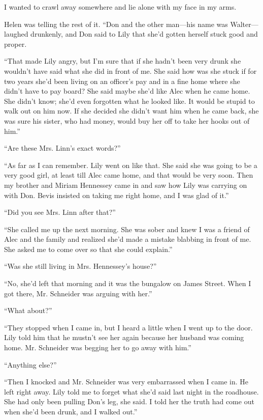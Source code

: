\documentclass{novel}
\begin{document}
I wanted to crawl away somewhere and lie alone with my face in my arms.

Helen was telling the rest of it. “Don and the other man—his name was Walter—laughed drunkenly, and Don said to Lily that she’d gotten herself stuck good and proper. 

“That made Lily angry, but I’m sure that if she hadn’t been very drunk she wouldn’t have said what she did in front of me. She said how was she stuck if for two years she’d been living on an officer’s pay and in a fine home where she didn’t have to pay board? She said maybe she’d like Alec when he came home. She didn’t know; she’d even forgotten what he looked like. It would be stupid to walk out on him now. If she decided she didn’t want him when he came back, she was sure his sister, who had money, would buy her off to take her hooks out of him.”

“Are these Mrs. Linn’s exact words?”

“As far as I can remember. Lily went on like that. She said she was going to be a very good girl, at least till Alec came home, and that would be very soon. Then my brother and Miriam Hennessey came in and saw how Lily was carrying on with Don. Bevis insisted on taking me right home, and I was glad of it.”

“Did you see Mrs. Linn after that?”

“She called me up the next morning. She was sober and knew I was a friend of Alec and the family and realized she’d made a mistake blabbing in front of me. She asked me to come over so that she could explain.”

“Was she still living in Mrs. Hennessey’s house?”

“No, she’d left that morning and it was the bungalow on James Street. When I got there, Mr. Schneider was arguing with her.”

“What about?”

“They stopped when I came in, but I heard a little when I went up to the door. Lily told him that he mustn’t see her again because her husband was coming home. Mr. Schneider was begging her to go away with him.”

“Anything else?”

“Then I knocked and Mr. Schneider was very embarrassed when I came in. He left right away. Lily told me to forget what she’d said last night in the roadhouse. She had only been pulling Don’s leg, she said. I told her the truth had come out when she’d been drunk, and I walked out.”
\end{document}
